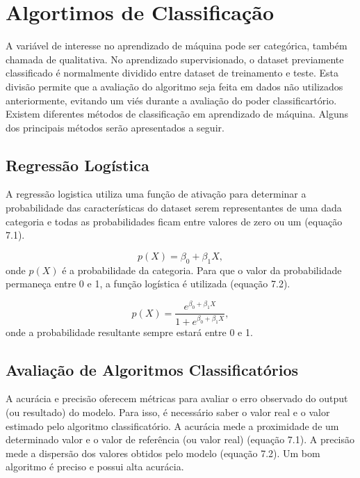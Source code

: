 \chapter{Algortimos de Classificação}

A variável de interesse no aprendizado de máquina pode ser categórica, também chamada de qualitativa. 
No aprendizado supervisionado, o dataset previamente classificado é normalmente dividido entre
dataset de treinamento e teste. Esta divisão permite que a avaliação do algoritmo seja feita em dados 
não utilizados anteriormente, evitando um viés durante a avaliação do poder classificartório. Existem 
diferentes métodos de classificação em aprendizado de máquina. Alguns dos principais métodos
serão apresentados a seguir.

\section{Regressão Logística}
A regressão logistica utiliza uma função de ativação para determinar a probabilidade 
das características do dataset serem representantes de uma dada categoria e todas as 
probabilidades ficam entre valores de zero ou um (equação 7.1).

\begin{equation}
      p(X) = \beta_{0} + \beta_{1}X,
\end{equation}
onde $p(X)$ é a probabilidade da categoria. Para que o valor da probabilidade 
permaneça entre 0 e 1, a função logística é utilizada (equação 7.2).

\begin{equation}
      p(X) = \frac{e^{\beta_{0} + \beta_{1}X}}{1 + e^{\beta_{0} + \beta_{1}X}},
\end{equation}
onde a probabilidade resultante sempre estará entre 0 e 1. 





\section{Avaliação de Algoritmos Classificatórios}

A acurácia e precisão oferecem métricas para avaliar o erro observado do output (ou resultado) do modelo. 
Para isso, é necessário saber o valor real e o valor estimado pelo algoritmo classificatório. 
A acurácia mede a proximidade de um determinado valor e o valor de referência (ou valor real) (equação 7.1). 
A precisão mede a dispersão dos valores obtidos pelo modelo (equação 7.2). 
Um bom algoritmo é preciso e possui alta acurácia. 

